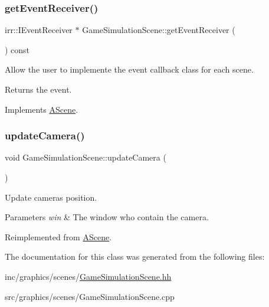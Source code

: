 \subsubsection{\texorpdfstring{get\+Event\+Receiver()}{getEventReceiver()}}
{\footnotesize\ttfamily irr\+::\+I\+Event\+Receiver $\ast$ Game\+Simulation\+Scene\+::get\+Event\+Receiver (\begin{DoxyParamCaption}{ }\end{DoxyParamCaption}) const\hspace{0.3cm}{\ttfamily [virtual]}}



Allow the user to implemente the event callback class for each scene. 

\begin{DoxyReturn}{Returns}
the event. 
\end{DoxyReturn}


Implements \hyperlink{classAScene_af521e5e6d30a5d2e5d30eb333e4d3abd}{A\+Scene}.

\mbox{\label{classGameSimulationScene_aae1a8d0e8d3f8b1cc51c9291b96c52ec}} 
\subsubsection{\texorpdfstring{update\+Camera()}{updateCamera()}}
{\footnotesize\ttfamily void Game\+Simulation\+Scene\+::update\+Camera (\begin{DoxyParamCaption}{ }\end{DoxyParamCaption})\hspace{0.3cm}{\ttfamily [virtual]}}



Update camera\textquotesingle{}s position. 


\begin{DoxyParams}{Parameters}
{\em win} & The window who contain the camera. \\
\hline
\end{DoxyParams}


Reimplemented from \hyperlink{classAScene_a0dd794c952276ec6c65a7e64fdec17cd}{A\+Scene}.



The documentation for this class was generated from the following files\+:\begin{DoxyCompactItemize}
\item 
inc/graphics/scenes/\hyperlink{GameSimulationScene_8hh}{Game\+Simulation\+Scene.\+hh}\item 
src/graphics/scenes/Game\+Simulation\+Scene.\+cpp\end{DoxyCompactItemize}
